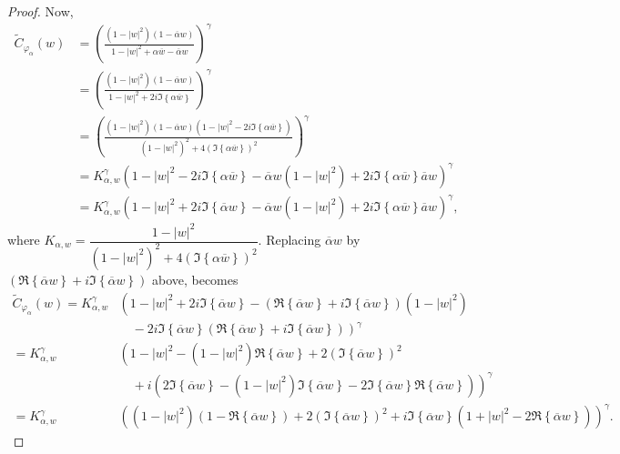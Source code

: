 \documentclass[12pt, reqno]{amsart}
\theoremstyle{definition}
\theoremstyle{remark}
\numberwithin{equation}{section}
\begin{document}
\begin{proof}
Now,
         \begin{equation*}
            \begin{split}
                \widetilde{C}_{\varphi_\alpha}(w)&=\left(\frac{\left(1-|w|^2\right)\left(1-\overline{\alpha}w\right)}{1-|w|^2+\alpha\overline{w}-\overline{\alpha}w}\right)^\gamma\\
                &=\left(\frac{\left(1-|w|^2\right)\left(1-\overline{\alpha}w\right)}{1-|w|^2+2i \Im\left\{\alpha\overline{w}\right\}}\right)^\gamma \\
                &=\left(\frac{\left(1-|w|^2\right)\left(1-\overline{\alpha}w\right)\left(1-|w|^2-2i \Im\left\{\alpha\overline{w}\right\}\right)}{\left(1-|w|^2\right)^2+4\left(\Im\left\{\alpha\overline{w}\right\}\right)^2}\right)^\gamma \\
                &=K_{\alpha,w}^\gamma\left(1-|w|^2-2i\Im\left\{\alpha\overline{w}\right\}-\overline{\alpha}w\left(1-|w|^2\right)+2i \Im\left\{\alpha\overline{w}\right\}\overline{a}w\right)^\gamma\\ 
                &=K_{\alpha,w}^\gamma\left(1-|w|^2+2i\Im\left\{\overline{\alpha}w\right\}-\overline{\alpha}w\left(1-|w|^2\right)+2i \Im\left\{\alpha\overline{w}\right\}\overline{a}w\right)^\gamma,
        \end{split}
         \end{equation*}
       where  $K_{\alpha,w}=\dfrac{1-|w|^2}{\left(1-|w|^2\right)^2+4\left(\Im\left\{\alpha\overline{w}\right\}\right)^2}$.
                  Replacing $\overline{\alpha}w$ by $\left(\Re\left\{\overline{\alpha}w\right\}+i \Im\left\{\overline{\alpha}w\right\}\right)$ above, becomes
          \begin{align*}
  \widetilde{C}_{\varphi_\alpha}(w)=K_{\alpha,w}^\gamma&\left(1-|w|^2+2i \Im\left\{\overline{\alpha}w\right\}-\left(\Re\left\{\overline{\alpha}w\right\}+i \Im\left\{\overline{\alpha}w\right\}\right)\left(1-|w|^2\right)\right.\\
  &\left. \quad-2i \Im\left\{\overline{\alpha}w\right\}\left(\Re\left\{\overline{\alpha}w\right\}+i \Im\left\{\overline{\alpha}w\right\}\right)\right)^\gamma\\
  =K_{\alpha,w}^\gamma &\left(1-|w|^2-\left(1-|w|^2\right)\Re\left\{\overline{\alpha}w\right\}+2\left(\Im\left\{\overline{\alpha}w\right\}\right)^2\right.\\
  &\left. \quad+i\left(2\Im\left\{\overline{\alpha}w\right\}-\left(1-|w|^2\right)\Im\left\{\overline{\alpha}w\right\}-2\Im\left\{\overline{\alpha}w\right\}\Re\left\{\overline{\alpha}w\right\}\right)\right)^\gamma\\
  =K_{\alpha,w}^\gamma&\left(\left(1-|w|^2\right)\left(1-\Re\left\{\overline{\alpha}w\right\}\right)+2\left(\Im\left\{\overline{\alpha}w\right\}\right)^2+ i \Im\left\{\overline{\alpha}w\right\}\left(1+|w|^2-2 \Re\left\{\overline{\alpha}w\right\}\right)\right)^\gamma.
           \end{align*}


\end{proof}
\end{document}
